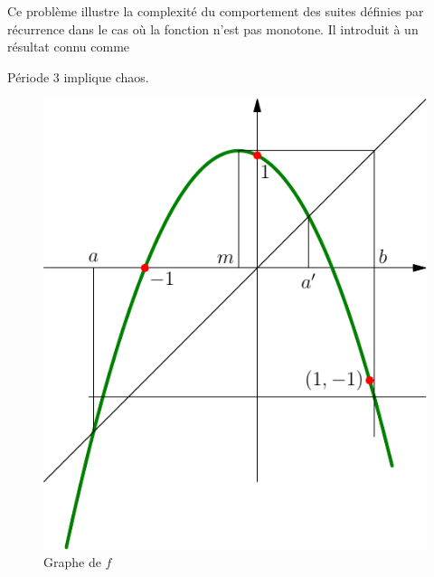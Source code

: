 Ce problème illustre la complexité du comportement des suites définies par récurrence dans le cas où la fonction n'est pas monotone. Il introduit à un résultat connu comme
\begin{center}
  \og Période 3 implique chaos. \fg
\end{center}

\begin{figure}[h]
  \centering
  \includegraphics{./Ep3impko_1.pdf}
  \caption{Graphe de $f$}
  \label{fig: Ep3impko_1}
\end{figure}

